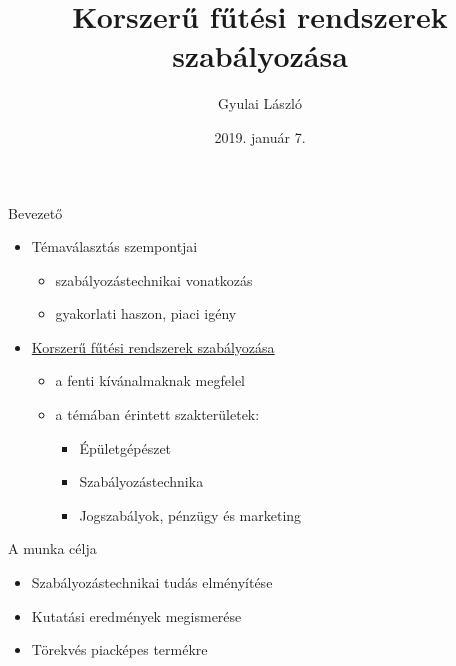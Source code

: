 \documentclass[14pt,handout]{beamer}
\title{Korszerű fűtési rendszerek szabályozása}
\author{Gyulai László}
\date{2019. január 7.}
\begin{document}
	
	\frame{\titlepage}
\begin{frame}{Bevezető}

    \begin{itemize}
        \item Témaválasztás szempontjai
        \pause
        \setlength{\itemsep}{6pt}
        \begin{itemize}
            \item szabályozástechnikai vonatkozás
            \item gyakorlati haszon, piaci igény 
        \end{itemize}
    	\pause
    	\item \underline{Korszerű fűtési rendszerek szabályozása}
    	\pause
        \begin{itemize}
            \setlength{\itemsep}{3pt}
        	\item a fenti kívánalmaknak megfelel
        	        	
	    	\item a témában érintett szakterületek:
	    	\pause
	        \begin{itemize}
	            \item Épületgépészet
	            \item Szabályozástechnika
	            \item Jogszabályok, pénzügy és marketing 
	        \end{itemize}
        \end{itemize}
    \end{itemize}

\end{frame}

\begin{frame}{A munka célja}
\begin{itemize}
	\setlength{\itemsep}{6pt}
	\item Szabályozástechnikai tudás elményítése
	\item Kutatási eredmények megismerése
	\item Törekvés piacképes termékre	
\end{itemize}
\end{frame}
\end{document}
